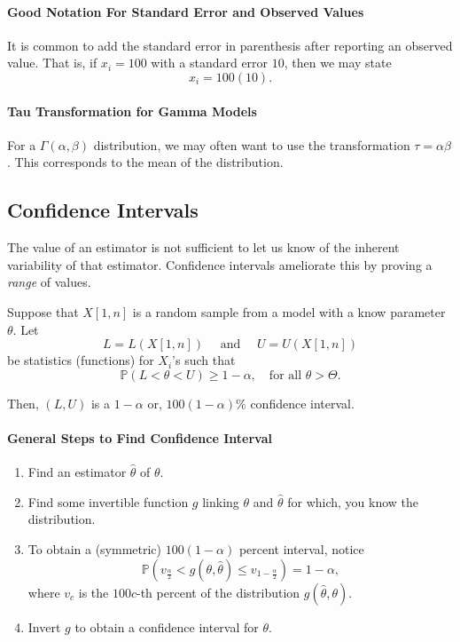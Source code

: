 \paragraph{Good Notation For Standard Error and Observed Values}
It is common to add the standard error in parenthesis after reporting an observed value.
That is, if \(x_i = 100\) with a standard error  \(10\), then we may state \[
  x_i = 100(10)
.\] 

\paragraph{Tau Transformation for Gamma Models}
For a \(\Gamma(\alpha, \beta)\) distribution, we may often want
to use the transformation  \(\tau = \alpha \beta\). This corresponds
to the mean of the distribution.


\subsection{Confidence Intervals}
The value of an estimator is not sufficient to let us know of the inherent variability
of that estimator. Confidence intervals ameliorate this by proving a \textit{range}
of values.

Suppose that \(X[1, n]\) is a random sample from a model with a know parameter  \(\theta\).
Let \[
  L = L(X[1, n]) \quad \text{ and } \quad U = U(X[1, n])
\]  be statistics (functions) for \(X_i\)'s such that  \[
  \mathbb{P}(L < \theta < U) \geq 1 - \alpha, \quad \text{for all } \theta > \Theta
.\] 

Then, \((L, U)\) is a  \(1 - \alpha\) or,  \(100(1 - \alpha)\%\) confidence interval.

\paragraph{General Steps to Find Confidence Interval}
\begin{enumerate}
  \item Find an estimator \(\hat{\theta}\) of \(\theta\).
  \item Find some invertible function \(g\) linking  \(\theta\) and \(\hat{\theta}\) for which,
    you know the distribution.
  \item To obtain a (symmetric) \(100(1 - \alpha)\) percent interval, notice  \[
      \mathbb{P}(v_{\frac{\alpha}{2}} < g(\theta, \hat{\theta}) \leq v_{1 - \frac{\alpha}{2}}) = 1 - \alpha
    ,\]  where \(v_c\) is the  \(100c\)-th percent of the distribution \(g(\hat{\theta}, \theta)\).
  \item Invert \(g\) to obtain a confidence interval for  \(\theta\).
\end{enumerate}

